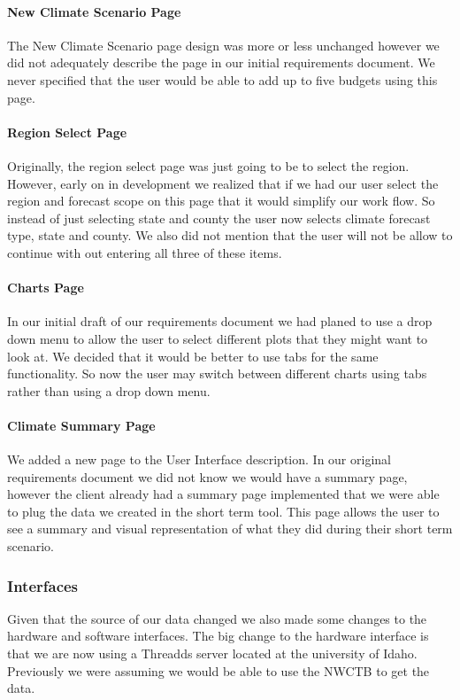 \documentclass[onecolumn, draftclsnofoot,10pt, compsoc]{article}
\begin{document}
	        \paragraph{New Climate Scenario Page}
	        The New Climate Scenario page design was more or less unchanged however we did not adequately describe the page in our initial requirements document. We never specified that the user would be able to add up to five budgets using this page.\\

	        \paragraph{Region Select Page}
	        Originally, the region select page was just going to be to select the region. However, early on in development we realized that if we had our user select the region and forecast scope on this page that it would simplify our work flow. So instead of just selecting state and county the user now selects climate forecast type, state and county. We also did not mention that the user will not be allow to continue with out entering all three of these items.\\

	        \paragraph{Charts Page}
	        In our initial draft of our requirements document we had planed to use a drop down menu to allow the user to select different plots that they might want to look at. We decided that it would be better to use tabs for the same functionality. So now the user may switch between different charts using tabs rather than using a drop down menu.\\

	        \paragraph{Climate Summary Page}
	        We added a new page to the User Interface description. In our original requirements document we did not know we would have a summary page, however the client already had a summary page implemented that we were able to plug the data we created in the short term tool. This page allows the user to see a summary and visual representation of what they did during their short term scenario.\\

        \subsubsection{Interfaces}
        Given that the source of our data changed we also made some changes to the hardware and software interfaces. The big change to the hardware interface is that we are now using a Threadds server located at the university of Idaho. Previously we were assuming we would be able to use the NWCTB to get the data.\\
\end{document}
